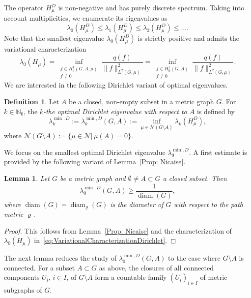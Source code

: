\documentclass[reqno]{amsart}
\theoremstyle{plain}
\newtheorem{lem}[thm]{Lemma}
\theoremstyle{definition}
\newtheorem{defn}[thm]{Definition}
\theoremstyle{remark}
\numberwithin{equation}{section}
\newcommand{\N}{\mathbb{N}}     %
\newcommand{\cN}{\mathcal{N}}
\newcommand{\diam}{\operatorname{diam}}
\begin{document}
The operator $H_\mu^D$ is non-negative and has purely discrete spectrum. Taking into account multiplicities, we enumerate its eigenvalues as 
\[
\lambda_0(H_\mu^D) \le \lambda_1(H_\mu^D) \le \lambda_2(H_\mu^D) \le \dots.
\]
Note that the smallest eigenvalue $\lambda_0(H_\mu^D)$ is strictly positive and admits the variational characterization
\begin{equation} \label{eq:VariationalCharacterizationDirichlet}
\lambda_0(H_\mu) = \inf_{\substack{f \in H^1_0(G, A, \mu) \\ f \neq 0}} \frac{q(f)}{\|f\|^2_{L^2(G, \mu)}} = \inf_{\substack{f \in H^1_0(G, A) \\ f \neq 0}} \frac{q(f)}{\|f\|^2_{L^2(G, \mu)}}.
\end{equation}
We are interested in the following Dirichlet variant of optimal eigenvalues.
\begin{defn}
Let $A$ be a closed, non-empty subset in a metric graph $G$. For $k \in \N_0$, the \emph{$k$-the optimal Dirichlet eigenvalue with respect to $A$} is defined by
\[
\lambda_k^{\min,D} :=  \lambda_k^{\min,D}(G, A) := \inf_{\mu \in \cN(G \setminus A)} \lambda_{k}(H_\mu^D),
\] 
where $\cN(G \setminus A) := \{\mu \in \cN| \, \mu(A) = 0\}$.
\end{defn}
We focus on the smallest optimal Dirichlet eigenvalue $\lambda_0^{\min,D}$. A first estimate is provided by the following variant of Lemma~\ref{Prop: Nicaise}.
\begin{lem}\label{Prop: Nicaise2}
Let $G$ be a metric graph and $\emptyset \neq A\subset G$ a closed subset. Then 
\begin{equation}\label{eq: Dirichlet Nicaise2}
	\lambda_{0}^{\min, D}(G, A) \geq \frac{1}{\diam(G)},
\end{equation}
where $\diam(G)= \diam_\varrho(G)$ is the diameter of $G$ with respect to the path metric $\varrho$. 
\end{lem}
\begin{proof}
This follows from Lemma~\ref{Prop: Nicaise} and the characterization of $\lambda_0(H_\mu)$ in~\eqref{eq:VariationalCharacterizationDirichlet}.
\end{proof}

The next lemma reduces the study of $\lambda_{0}^{\min, D}(G,A)$ to the case where $G \setminus A$ is connected. For a subset $A \subset G$ as above, the closures of all connected components $U_i$, $i \in I$, of $G \setminus A$ form a countable family $(\overline U_i)_{i \in I}$ of metric subgraphs of $G$.
\end{document}
